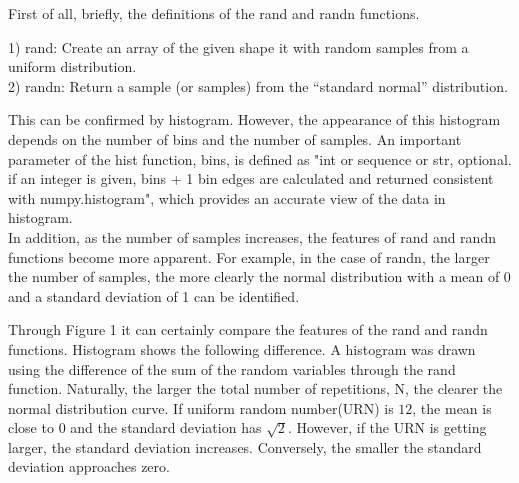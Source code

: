 \documentclass[letterpaper, 11pt]{article}
\begin{document}
First of all, briefly, the definitions of the rand and randn functions.
\begin{center}
1) rand: Create an array of the given shape it with random samples from a uniform distribution.\\
2) randn: Return a sample (or samples) from the “standard normal” distribution.
\end{center}
\begin{figure}[h] %
\centering
{}
\end{figure}
This can be confirmed by histogram. However, the appearance of this histogram depends on the number of bins and the number of samples.
An important parameter of the hist function, bins, is defined as "int or sequence or str, optional. if an integer is given, bins + 1 bin edges are calculated and returned consistent with numpy.histogram", which provides an accurate view of the data in histogram.\\
In addition, as the number of samples increases, the features of rand and randn functions become more apparent.
For example, in the case of randn, the larger the number of samples, the more clearly the normal distribution with a mean of 0 and a standard deviation of 1 can be identified.

\noindent Through Figure 1 it can certainly compare the features of the rand and randn functions. Histogram shows the following difference. A histogram was drawn using the difference of the sum of the random variables through the rand function. Naturally, the larger the total number of repetitions, N, the clearer the normal distribution curve. If uniform random number(URN) is $12$, the mean is close to $0$ and the standard deviation has $\sqrt{2}$. However, if the URN is getting larger, the standard deviation increases. Conversely, the smaller the standard deviation approaches zero.
\end{document}
